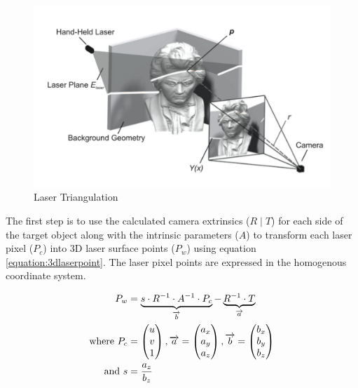 \begin{figure}[ht!]
\centering
\includegraphics[width=0.9\linewidth]{figures/pointcloudpaper}
\caption{Laser Triangulation \cite{winkelbach:2006}}
\label{figure:triangulation}
\end{figure}

The first step is to use the calculated camera extrinsics ($R \mid T$) for
each side of the target object along with the intrinsic parameters ($A$) to
transform each laser pixel ($P_c$) into 3D laser surface points ($P_w$) using
equation \ref{equation:3dlaserpoint}. The laser pixel points are expressed in
the homogenous coordinate system.

\begin{align}
	\label{equation:3dlaserpoint}
	P_w &= 	\underbrace{s \cdot R^{-1}
 					 							\cdot A^{-1}
 												\cdot P_c
										 }_\text{$\overrightarrow{b}$}
					-
					\underbrace{
											R^{-1} \cdot T
										 }_\text{$\overrightarrow{a}$} \\
	\text{where}~
	P_c &= \begin{pmatrix}
						u \\
						v \\
						1 \\
				 \end{pmatrix},
	\overrightarrow{a} = \begin{pmatrix}
													a_x \\
													a_y \\
													a_z \\
												\end{pmatrix},
	\overrightarrow{b} = \begin{pmatrix}
													b_x \\
													b_y \\
													b_z \\
												\end{pmatrix} \notag \\
  \text{and}~ s &= \frac{a_z}{b_z} \notag
\end{align}

